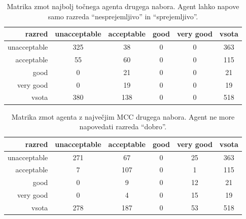 \begin{table}[H]
    \centering
    \begin{tabular}{||rccccc||}
        \hline
        razred       & unacceptable & acceptable & good & very good & vsota \\ \hline
        unacceptable & 325          & 38         & 0    & 0         & 363   \\ \hline
        acceptable   & 55           & 60         & 0    & 0         & 115   \\ \hline
        good         & 0            & 21         & 0    & 0         & 21    \\ \hline
        very good    & 0            & 19         & 0    & 0         & 19    \\ \hline
        vsota        & 380          & 138        & 0    & 0         & 518   \\ \hline
    \end{tabular}
    \caption{Matrika zmot najbolj točnega agenta drugega nabora. Agent lahko napove samo razreda \enquote{nesprejemljivo} in \enquote{sprejemljivo}.}
    \label{tab:car_acc_2}
\end{table}

\begin{table}[H]
    \centering
    \begin{tabular}{||rccccc||}
        \hline
        razred       & unacceptable & acceptable & good & very good & vsota \\ \hline
        unacceptable & 271          & 67         & 0    & 25        & 363   \\ \hline
        acceptable   & 7            & 107        & 0    & 1         & 115   \\ \hline
        good         & 0            & 9          & 0    & 12        & 21    \\ \hline
        very good    & 0            & 4          & 0    & 15        & 19    \\ \hline
        vsota        & 278          & 187        & 0    & 53        & 518   \\ \hline
    \end{tabular}
    \caption{Matrika zmot agenta z največjim MCC drugega nabora. Agent ne more napovedati razreda \enquote{dobro}.}
    \label{tab:car_mcc_2}
\end{table}

